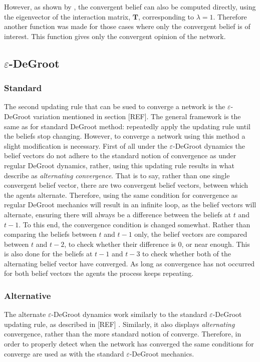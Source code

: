 \documentclass[a4paper, 12pt]{report}
\newcommand{\T}{\bm{T}}
\begin{document}
However, as shown by \parencite{degroot1974concensus}, the convergent belief can also be computed directly, using the eigenvector of the interaction matrix, $\T$, corresponding to $\lambda=1$. Therefore another function was made for those cases where only the convergent belief is of interest. This function gives only the convergent opinion of the network.

\subsection{$\varepsilon$-DeGroot}
\subsubsection{Standard}

The second updating rule that can be sued to converge a network is the $\varepsilon$-DeGroot variation mentioned in section [REF]. The general framework is the same as for standard DeGroot method: repeatedly apply the updating rule until the beliefs stop changing. However, to converge a network using this method a slight modification is necessary. First of all under the $\varepsilon$-DeGroot dynamics the belief vectors do not adhere to the standard notion of convergence as under regular DeGroot dynamics, rather, using this updating rule results in what \parencite{amir2021robust} describe as \textit{alternating convergence}. That is to say, rather than one single convergent belief vector, there are two convergent belief vectors, between which the agents alternate.
Therefore, using the same condition for convergence as regular DeGroot mechanics will result in an infinite loop, as the belief vectors will alternate, ensuring there will always be a difference between the beliefs at $t$ and $t-1$. To this end, the convergence condition is changed somewhat. Rather than comparing the beliefs between $t$ and $t-1$ only, the belief vectors are compared between $t$ and $t-2$, to check whether their difference is 0, or near enough. This is also done for the beliefs at $t-1$ and $t-3$ to check whether both of the alternating belief vector have converged. As long as convergence has not occurred for both belief vectors the agents the process keeps repeating.

\subsubsection{Alternative}

The alternate $\varepsilon$-DeGroot dynamics work similarly to the standard $\varepsilon$-DeGroot updating rule, as described in [REF] . Similarly, it also displays \textit{alternating} convergence, rather than the more standard notion of converge. Therefore, in order to properly detect when the network has converged the same conditions for converge are used as with the standard $\varepsilon$-DeGroot mechanics.
\end{document}
